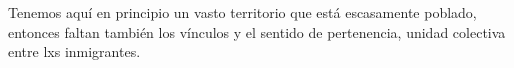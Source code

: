 Tenemos aquí en principio un vasto territorio que está escasamente poblado, entonces faltan también los vínculos y el sentido de pertenencia, unidad colectiva entre lxs inmigrantes.
\begin{comment}
# nación

* imaginación de América Latina por parte de l@s europe@s:
  * continente jóven, fuerza, potencia, eine unbeschriebene Seite; recursos naturales...
  * pero no ha cumplido con éxito la modernidad (europea)

* nación: de "nascere"=nacer
* la idea principal de nación: grupos de personas que provienen del mismo lugar; funciona de forma metafórica como una gran familia
* más tarde: un grupo que comparte la misma lengua y cultura~\cite{SzIr2009}{p.189}
  * "miembros compartan una historia, costumbres y tradiciones(comida, música, vestimenta, calendarios de fiestas, etc.), práctias culturales, imaginarios, cánones de literatura, de cine y de artes plásticas, así como valores éticos y morales."~\cite{SzIr2009}{p.190}
   ---> \texit{Evita}: calendario de fiestas al final!
* estado-nación (que no es realidad en ningún lugar)
  * definirse en homogenidad interna
  * y en contraste con lo que está fuera
  * sobre todo una identidad administrativa y política (no solamente cuestión de identidad, cultura...)
  * quién forma parte?: definido en primera linea por las fronteras administrativas

* la nación como una unidad/comunidad:
  * imaginada: vgl Benedict Anderson "comunidades imaginadas"
  * limitada: entidades discretas
  * soberanea
  * oft: "Con el intentode divulgar valores éticos y morales comunes [...] preservar en el Estado-nación una unidad religiosa, lo que ha llevado a procesos de exclusión para los que no son del mismo credo."~\cite{SzIr2009}{p.190}

* el concepto de ciudadanía (sólo para el sujeto masculino heterosexual por supuesto) ~\cite{SzIr2009}{p.189}

* memoria histórica colectiva ~\cite{SzIr2009}{p.191}
* "monumentos, recintos conmemorativos, manuales escolares para la enseñanza de la historia, calendarios de fiesta, ..."~\cite{SzIr2009}{p.191}

* sentido de pertenencia, más allá de los límites geográficos -> movid@s por emociones!!
* confianza en el aparato administrativo/político del estado que garantiza la preservación del estado-nación

"[...] la conformación de los Estados-nación se ha fundamentado en la aparición de un grupo social - por lo general la burguesía- capaz de establecer su hegemonía y de definir un proyecto político de autodeterminación que aglutina a todos los demás secores de la población"~\cite{SzIr2009}(p.190)
-- la burguesía derrocada durante el Peronismo: la base era la clase trabajadora


\end{comment}
